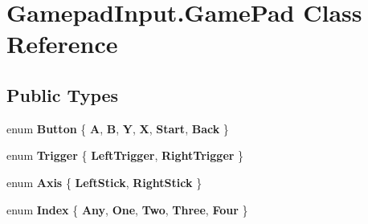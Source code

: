 \hypertarget{class_gamepad_input_1_1_game_pad}{}\section{Gamepad\+Input.\+Game\+Pad Class Reference}
\label{class_gamepad_input_1_1_game_pad}
\subsection*{Public Types}
\begin{DoxyCompactItemize}
\item 
\mbox{\label{class_gamepad_input_1_1_game_pad_a2ce8919a41406394f2d8f02521f12f0a}} 
enum {\bfseries Button} \{ \newline
{\bfseries A}, 
{\bfseries B}, 
{\bfseries Y}, 
{\bfseries X}, 
\newline
{\bfseries Start}, 
{\bfseries Back}
 \}
\item 
\mbox{\label{class_gamepad_input_1_1_game_pad_a51c5c01146af5c0beadf207c3bce744b}} 
enum {\bfseries Trigger} \{ {\bfseries Left\+Trigger}, 
{\bfseries Right\+Trigger}
 \}
\item 
\mbox{\label{class_gamepad_input_1_1_game_pad_a3194f6b083aa3d4645450311ad7c4f48}} 
enum {\bfseries Axis} \{ {\bfseries Left\+Stick}, 
{\bfseries Right\+Stick}
 \}
\item 
\mbox{\label{class_gamepad_input_1_1_game_pad_afa6622349e6520cce1f7c82d9f38c3ef}} 
enum {\bfseries Index} \{ \newline
{\bfseries Any}, 
{\bfseries One}, 
{\bfseries Two}, 
{\bfseries Three}, 
\newline
{\bfseries Four}
 \}
\end{DoxyCompactItemize}
